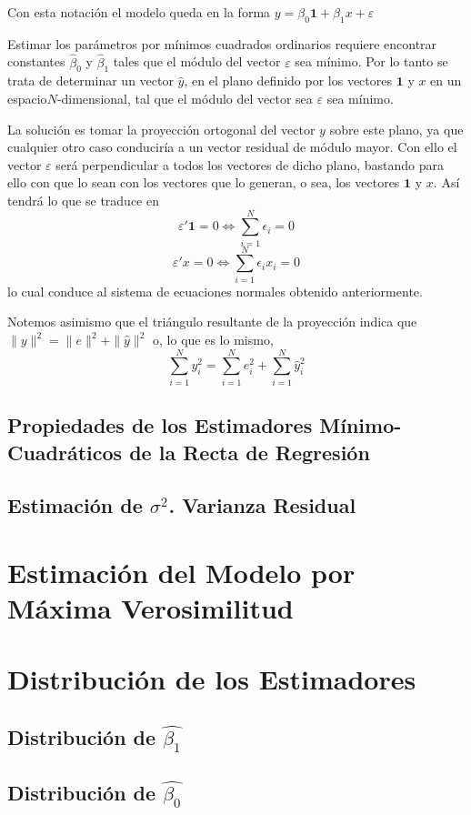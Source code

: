 \documentclass[10pt,a4paper]{book}
\begin{document}
Con esta notación el modelo queda en la forma $y=\beta_0\mathbf{1}+\beta_1x+\varepsilon$

Estimar los parámetros por mínimos cuadrados ordinarios requiere encontrar constantes $\widehat{\beta}_0$ y $\widehat{\beta}_1$ tales que el módulo del vector $\varepsilon$ sea mínimo. Por lo tanto se trata de determinar un vector $\widehat{y}$, en el plano definido por los vectores $\mathbf{1}$ y $x$ en un espacio$N$-dimensional, tal que el módulo del vector sea $\varepsilon$ sea mínimo.

La solución es tomar la proyección ortogonal del vector $y$ sobre este plano, ya que cualquier otro caso conduciría a un vector residual de módulo mayor. Con ello el vector $\varepsilon$ será perpendicular a todos los vectores de dicho plano, bastando para ello con que lo sean con los vectores que lo generan, o sea, los vectores $\mathbf{1}$ y $x$. Así tendrá
lo que se traduce en $$\varepsilon'\mathbf{1}=0 \Leftrightarrow \sum^N_{i=1}\epsilon_i=0$$ $$\varepsilon'x=0 \Leftrightarrow \sum^N_{i=1}\epsilon_ix_i=0$$ lo cual conduce al sistema de ecuaciones normales obtenido anteriormente.

Notemos asimismo que el triángulo resultante de la proyección indica que $\parallel y\parallel^2=\parallel e\parallel ^2+\parallel \widehat{y}\parallel ^2$ o, lo que es lo mismo, $$\sum^N_{i=1}y^2_i=\sum^N_{i=1}e_i^2+\sum^N_{i=1}\widehat{y}_i^2$$
		\subsection{Propiedades de los Estimadores Mínimo-Cuadráticos de la Recta de Regresión}
		\subsection{Estimación de $\sigma^2$. Varianza Residual}
	\section{Estimación del Modelo por Máxima Verosimilitud}
	\section{Distribución de los Estimadores}
		\subsection{Distribución de $\widehat{\beta_1}$}
		\subsection{Distribución de $\widehat{\beta_0}$}
\end{document}
